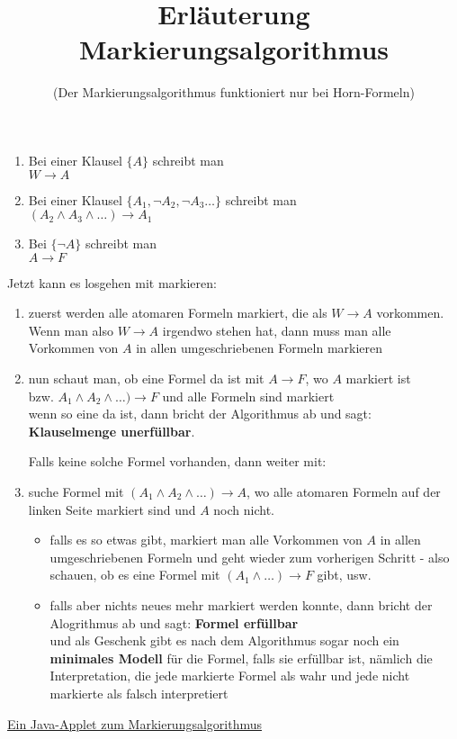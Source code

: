 \documentclass[a4paper]{scrartcl}
\begin{document}
\title{Erläuterung Markierungsalgorithmus}
\subtitle{(Der Markierungsalgorithmus funktioniert nur bei Horn-Formeln)}
\maketitle

\begin{enumerate}
\item Bei einer Klausel $\{A\}$ schreibt man\\
$W \rightarrow A$

\item Bei einer Klausel $\{A_1, \neg A_2, \neg A_3 … \}$ schreibt man\\
$(A_2 \wedge A_3 \wedge … ) \rightarrow A_1$

\item Bei $\{\neg A\}$ schreibt man\\
$A \rightarrow F$
\end{enumerate}

Jetzt kann es losgehen mit markieren:

\begin{enumerate}
\item zuerst werden alle atomaren Formeln markiert, die als $W \rightarrow A$ vorkommen.\\
Wenn man also $W \rightarrow A$ irgendwo stehen hat, dann muss man alle Vorkommen von $A$ in allen umgeschriebenen Formeln markieren

\item nun schaut man, ob eine Formel da ist mit $A \rightarrow F$, wo $A$ markiert ist\\
bzw. $A_1 \wedge A_2 \wedge … ) \rightarrow F$ und alle Formeln sind markiert\\
wenn so eine da ist, dann bricht der Algorithmus ab und sagt: \textbf{Klauselmenge unerfüllbar}.

Falls keine solche Formel vorhanden, dann weiter mit:

\item suche Formel mit $(A_1 \wedge A_2 \wedge …) \rightarrow A$, wo alle atomaren Formeln auf der linken Seite markiert sind und $A$ noch nicht.

\begin{itemize}
\item falls es so etwas gibt, markiert man alle Vorkommen von $A$ in allen umgeschriebenen Formeln und geht wieder zum vorherigen Schritt - also schauen, ob es eine Formel mit $(A_1 \wedge …) \rightarrow F$ gibt, usw.

\item falls aber nichts neues mehr markiert werden konnte, dann bricht der Alogrithmus ab und sagt: \textbf{Formel erfüllbar}\\
und als Geschenk gibt es nach dem Algorithmus sogar noch ein \textbf{minimales Modell} für die Formel, falls sie erfüllbar ist, nämlich die Interpretation, die jede markierte Formel als wahr und jede nicht markierte als falsch interpretiert
\end{itemize}

\end{enumerate}

\href{http://downloads.mennicke.info/theory/ErfuellbarkeitstestHornformel.html}{Ein Java-Applet zum Markierungsalgorithmus}
\end{document}
